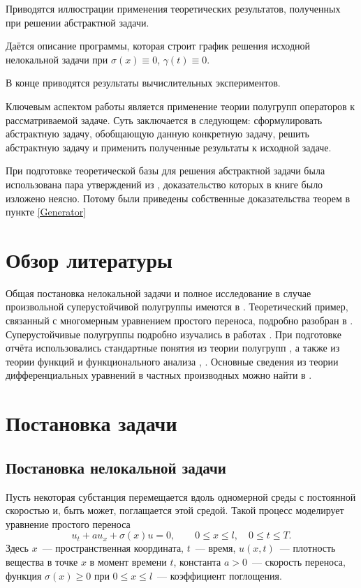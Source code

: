 \documentclass{article}
\renewcommand{\le}{\leqslant}
\renewcommand{\ge}{\geqslant}
\theoremstyle{definition}
\begin{document}
Приводятся иллюстрации применения теоретических результатов, полученных при решении абстрактной задачи.

Даётся описание программы, которая строит график решения исходной нелокальной задачи при 
$\sigma(x) \equiv 0$, $\gamma(t) \equiv 0$.

В конце приводятся результаты вычислительных экспериментов.

Ключевым аспектом работы является применение теории полугрупп операторов к рассматриваемой задаче. 
Суть заключается в следующем: сформулировать абстрактную задачу, обобщающую данную конкретную задачу,
решить абстрактную задачу и применить полученные результаты к исходной задаче. 

При подготовке теоретической базы для решения абстрактной задачи была использована пара утверждений из \cite{Pazy},
доказательство которых в книге было изложено неясно. Потому были приведены собственные доказательства теорем в пункте \ref{Generator}


\newpage

\section{Обзор литературы}
Общая постановка нелокальной задачи и полное исследование
в случае произвольной суперустойчивой полугруппы имеются в \cite{Tikhonov1}.
Теоретический пример, связанный с многомерным уравнением простого переноса,
подробно разобран в \cite{Tikhonov2}.
Суперустойчивые полугруппы подробно изучались в работах \cite{Balakrishnan_1, Balakrishnan_2}.
При подготовке отчёта использовались стандартные понятия из теории полугрупп \cite{Dunford_Schwartz, Pazy},
а также из теории функций и функционального анализа \cite{Kolmogorov_Fomin}, \cite{Trenogin}.
Основные сведения из теории дифференциальных уравнений в частных производных можно найти в \cite{Filippov}.

\newpage

\section{Постановка задачи}

\subsection{Постановка нелокальной задачи}
Пусть некоторая субстанция перемещается вдоль одномерной среды с постоянной скоростью и, быть может, поглащается этой средой.
Такой процесс моделирует уравнение простого переноса
\begin{equation} \label{transport equation}
	u_t + au_x + \sigma(x)u = 0, \qquad 0 \le x \le l, \quad 0 \le t \le T.
\end{equation}
Здесь $x$~--- пространственная координата, $t$~--- время, $u(x,t)$~--- плотность вещества в точке $x$ в момент времени $t$, 
константа $ a > 0 $~--- скорость переноса, функция $ \sigma(x) \ge 0 $ при $ 0 \le x \le l $~--- коэффициент поглощения.
\end{document}
